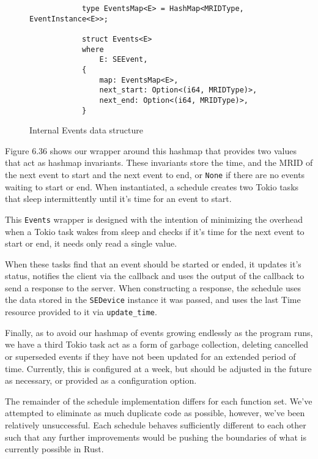 \begin{figure}[h]
    \begin{center}
        \begin{lstlisting}
            type EventsMap<E> = HashMap<MRIDType, EventInstance<E>>;

            struct Events<E>
            where
                E: SEEvent,
            {
                map: EventsMap<E>,
                next_start: Option<(i64, MRIDType)>,
                next_end: Option<(i64, MRIDType)>,
            }
        \end{lstlisting}
        \label{fig:eventmapimpl}
        \vspace{-10pt}
        \caption{Internal Events data structure}
    \end{center}
\end{figure}

Figure 6.36 shows our wrapper around this hashmap that provides two values that act as hashmap invariants. These invariants store the time, and the MRID of the next event to start and the next event to end, or \texttt{None} if there are no events waiting to start or end. When instantiated, a schedule creates two Tokio tasks that sleep intermittently until it's time for an event to start. 

This \texttt{Events} wrapper is designed with the intention of minimizing the overhead when a Tokio task wakes from sleep and checks if it's time for the next event to start or end, it needs only read a single value.

When these tasks find that an event should be started or ended, it updates it's status, notifies the client via the callback and uses the output of the callback to send a response to the server. When constructing a response, the schedule uses the data stored in the \texttt{SEDevice} instance it was passed, and uses the last Time resource provided to it via \texttt{update\_time}.

Finally, as to avoid our hashmap of events growing endlessly as the program runs, we have a third Tokio task act as a form of garbage collection, deleting cancelled or superseded events if they have not been updated for an extended period of time. Currently, this is configured at a week, but should be adjusted in the future as necessary, or provided as a configuration option.

The remainder of the schedule implementation differs for each function set. We've attempted to eliminate as much duplicate code as possible, however, we've been relatively unsuccessful. Each schedule behaves sufficiently different to each other such that any further improvements would be pushing the boundaries of what is currently possible in Rust.

